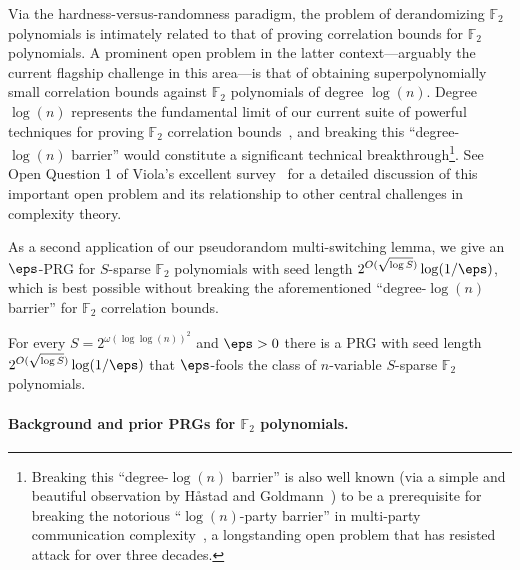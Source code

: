 \documentclass{toc}
\theoremstyle{plain}
\renewcommand{\F}{\mathds{F}}
\begin{document}
Via the hardness-versus-randomness paradigm, the problem of derandomizing $\F_2$ polynomials is intimately related to that of proving correlation bounds for $\F_2$ polynomials.  A prominent open problem in the latter context---arguably the current flagship challenge in this area---is that of obtaining superpolynomially small correlation bounds against $\F_2$ polynomials of degree $\log(n)$.  Degree $\log(n)$ represents the fundamental limit of our current suite of powerful techniques for proving $\F_2$ correlation bounds~\cite{BNS92,Bou05,Cha07,VW07}, and breaking this %
``degree-$\log(n)$ barrier'' %
would constitute a significant technical breakthrough\footnote{Breaking this ``degree-$\log(n)$ barrier'' %
is also %
well known  %
(via a simple and beautiful observation
%
by  %
H{\aa}stad and Goldmann~\cite{HG91}) to be a prerequisite for breaking the notorious ``$\log(n)$-party %
barrier'' in multi-party communication complexity~\cite{BNS92}, a longstanding open problem that has resisted attack for over
%
three %
decades.}.  See Open Question 1 of Viola's excellent survey~\cite{Viola09now} for a detailed discussion of this important open problem and its relationship %
to  %
other central challenges in complexity theory.

As a second application of our pseudorandom multi-switching lemma, we give an $\eps$-PRG for $S$-sparse $\F_2$ polynomials with seed length $2^{O(\sqrt{\log S})}\log(1/\eps)$, which is best possible without breaking the aforementioned 
``degree-$\log(n)$ %
barrier'' for $\F_2$ correlation 
bounds. %


\begin{theorem}[PRG for sparse $\F_2$ polynomials] \label{thm:second}
For every $S =  2^{\omega(\log \log(n))^2}$ and $\eps > 0$ there is a PRG with seed length $2^{O(\sqrt{\log S})}\log(1/\eps)$ that $\eps$-fools the class of $n$-variable $S$-sparse $\F_2$ polynomials. 
\end{theorem}


\paragraph{Background and prior PRGs for $\F_2$ polynomials.}
\end{document}

